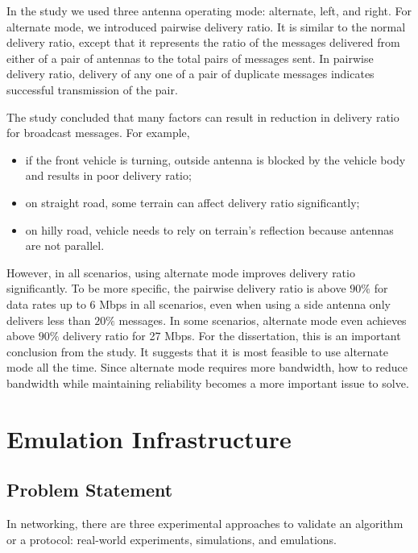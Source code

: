 \documentclass[12pt]{report}
\begin{document}
In the study we used three antenna operating mode: alternate, left, and right. For alternate mode, we introduced pairwise delivery ratio. It is similar to the normal delivery ratio, except that it represents the ratio of the messages delivered from either of a pair of antennas to the total pairs of messages sent. In pairwise delivery ratio, delivery of any one of a pair of duplicate messages indicates successful transmission of the pair. 

The study concluded that many factors can result in reduction in delivery ratio for broadcast messages. For example,

\begin{itemize}
  \item if the front vehicle is turning, outside antenna is blocked by the vehicle body and results in poor delivery ratio;
  \item on straight road, some terrain can affect delivery ratio significantly;
  \item on hilly road, vehicle needs to rely on terrain's reflection because antennas are not parallel.
\end{itemize}

However, in all scenarios, using alternate mode improves delivery ratio significantly. To be more specific, the pairwise delivery ratio is above $90\%$ for data rates up to 6 Mbps in all scenarios, even when using a side antenna only delivers less than $20\%$ messages. In some scenarios, alternate mode even achieves above $90\%$ delivery ratio for 27 Mbps. \cite{songDSRC2016} For the dissertation, this is an important conclusion from the study. It suggests that it is most feasible to use alternate mode all the time. Since alternate mode requires more bandwidth, how to reduce bandwidth while maintaining reliability becomes a more important issue to solve.

\chapter{Emulation Infrastructure}

\section{Problem Statement}
\label{sec:problem_validation}

In networking, there are three experimental approaches to validate an algorithm or a protocol: real-world experiments, simulations, and emulations.
\end{document}
